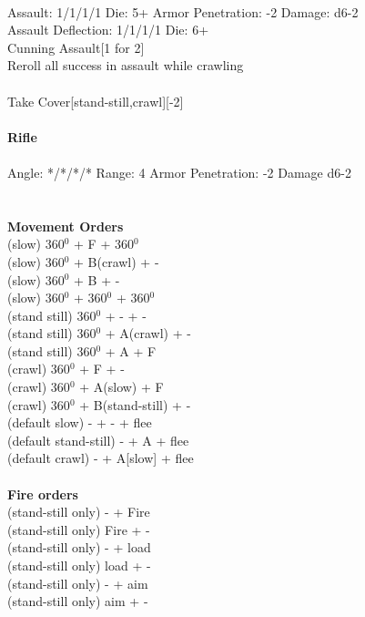 \ \\
Assault: 1/1/1/1 Die: 5+ Armor Penetration: -2 Damage: d6-2 \\
Assault Deflection: 1/1/1/1 Die: 6+\\
\indent Cunning Assault[1 for 2]\\ Reroll all success in assault while crawling \\
\ \\
Take Cover[stand-still,crawl][-2]
\ \\
\ \\
{\bf Rifle } \\
\ \\
Angle: */*/*/* Range: 4 Armor Penetration: -2 Damage d6-2 \\
\indent  \\





\ \\ {\bf Movement Orders } \\
(slow) 360$^0$ + F + 360$^0$ \\
(slow) 360$^0$ + B(crawl) + - \\
(slow) 360$^0$ + B + - \\
(slow) 360$^0$ + 360$^0$ + 360$^0$ \\
(stand still) 360$^0$ + - + -  \\
(stand still) 360$^0$ + A(crawl) + - \\
(stand still) 360$^0$ + A + F \\
(crawl) 360$^0$ + F + - \\
(crawl) 360$^0$ + A(slow) + F \\
(crawl) 360$^0$ + B(stand-still) + - \\
(default slow) - + - + flee \\
(default stand-still) - + A + flee \\
(default crawl) - + A[slow] + flee \\
\ \\ {\bf Fire orders } \\
(stand-still only) - + Fire \\
(stand-still only) Fire + -  \\
(stand-still only) - + load \\
(stand-still only) load + - \\
(stand-still only) - + aim \\
(stand-still only) aim + -  \\




